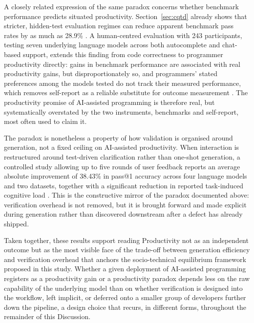 A closely related expression of the same paradox concerns whether benchmark performance predicts situated productivity. Section~\ref{sec:cqtd} already shows that stricter, hidden-test evaluation regimes can reduce apparent benchmark pass rates by as much as 28.9\% \cite{liu_is_2023}. A human-centred evaluation with 243 participants, testing seven underlying language models across both autocomplete and chat-based support, extends this finding from code correctness to programmer productivity directly: gains in benchmark performance are associated with real productivity gains, but disproportionately so, and programmers' stated preferences among the models tested do not track their measured performance, which removes self-report as a reliable substitute for outcome measurement \cite{mozannar_realhumaneval_2024}. The productivity promise of AI-assisted programming is therefore real, but systematically overstated by the two instruments, benchmarks and self-report, most often used to claim it.

The paradox is nonetheless a property of how validation is organised around generation, not a fixed ceiling on AI-assisted productivity. When interaction is restructured around test-driven clarification rather than one-shot generation, a controlled study allowing up to five rounds of user feedback reports an average absolute improvement of 38.43\% in pass@1 accuracy across four language models and two datasets, together with a significant reduction in reported task-induced cognitive load \cite{fakhoury_llm-based_2024}. This is the constructive mirror of the paradox documented above: verification overhead is not removed, but it is brought forward and made explicit during generation rather than discovered downstream after a defect has already shipped.

Taken together, these results support reading Productivity not as an independent outcome but as the most visible face of the trade-off between generation efficiency and verification overhead that anchors the socio-technical equilibrium framework proposed in this study. Whether a given deployment of AI-assisted programming registers as a productivity gain or a productivity paradox depends less on the raw capability of the underlying model than on whether verification is designed into the workflow, left implicit, or deferred onto a smaller group of developers further down the pipeline, a design choice that recurs, in different forms, throughout the remainder of this Discussion.

